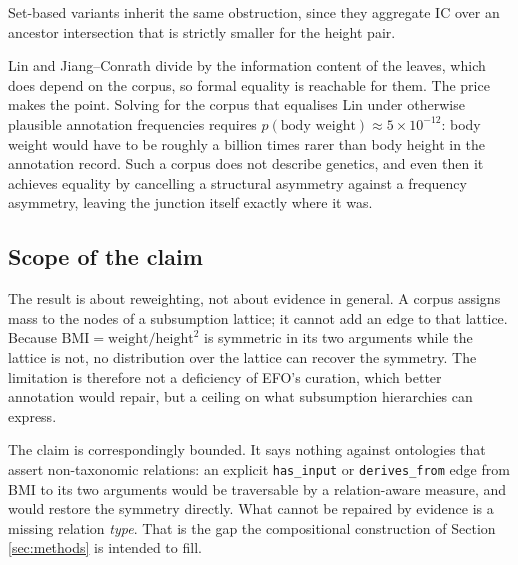 Set-based variants inherit the same obstruction, since they aggregate IC over an ancestor intersection that is strictly smaller for the height pair.

Lin and Jiang--Conrath divide by the information content of the leaves, which does depend on the corpus, so formal equality is reachable for them. The price makes the point. Solving for the corpus that equalises Lin under otherwise plausible annotation frequencies requires $p(\textrm{body weight}) \approx 5 \times 10^{-12}$: body weight would have to be roughly a billion times rarer than body height in the annotation record. Such a corpus does not describe genetics, and even then it achieves equality by cancelling a structural asymmetry against a frequency asymmetry, leaving the junction itself exactly where it was.

\subsection{Scope of the claim}
\label{sec:supp-scope}

The result is about reweighting, not about evidence in general. A corpus assigns mass to the nodes of a subsumption lattice; it cannot add an edge to that lattice. Because $\mathrm{BMI} = \mathrm{weight}/\mathrm{height}^{2}$ is symmetric in its two arguments while the lattice is not, no distribution over the lattice can recover the symmetry. The limitation is therefore not a deficiency of EFO's curation, which better annotation would repair, but a ceiling on what subsumption hierarchies can express.

The claim is correspondingly bounded. It says nothing against ontologies that assert non-taxonomic relations: an explicit \texttt{has\_input} or \texttt{derives\_from} edge from BMI to its two arguments would be traversable by a relation-aware measure, and would restore the symmetry directly. What cannot be repaired by evidence is a missing relation \textit{type}. That is the gap the compositional construction of Section \ref{sec:methods} is intended to fill.
